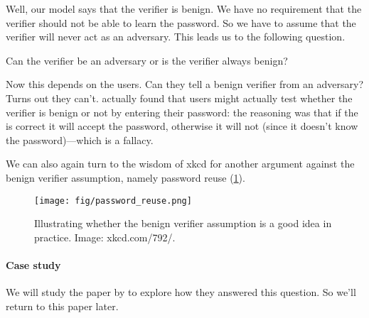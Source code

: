 Well, our model says that the verifier is benign.
We have no requirement that the verifier should not be able to learn the 
password.
So we have to assume that the verifier will never act as an adversary.
This leads us to the following question.

\begin{frame}
  \begin{question}
    Can the verifier be an adversary or is the verifier always benign?
  \end{question}
\end{frame}

Now this depends on the users.
Can they tell a benign verifier from an adversary?
Turns out they can't\autocite{WhyPhishingWorks}.
 actually found that users might actually test 
whether the verifier is benign or not by entering their password:
the reasoning was that if the is correct it will accept the password, otherwise 
it will not (since it doesn't know the password)---which is a fallacy.

We can also again turn to the wisdom of xkcd for another argument against the 
benign verifier assumption, namely password reuse (\cref{xkcd792}).

\begin{frame}
  \begin{figure}
    \texttt{[image: fig/password\_reuse.png]}
    \caption{%
      Illustrating whether the benign verifier assumption is a good idea in 
      practice.
      Image: xkcd.com/792/.
    }\label{xkcd792}
  \end{figure}
\end{frame}

\paragraph{Case study}

We will study the paper by \textcite{WhyPhishingWorks} to explore how they 
answered this question.
So we'll return to this paper later.

